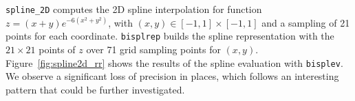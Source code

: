 \documentclass[11pt]{article}
\begin{document}
\texttt{spline\_2D} computes the 2D spline interpolation for function $z=(x+y)e^{-6(x^2+y^2)}$, with $(x,y) \in [-1,1]\times[-1,1]$ and a sampling of 21 points for each coordinate. \texttt{bisplrep} builds the spline representation with the $21 \times 21$ points of $z$ over 71 grid sampling points for $(x,y)$. Figure~\ref{fig:spline2d_rr} shows the results of the spline evaluation with \texttt{bisplev}.  We observe a significant loss of precision in places, which follows 
an interesting pattern that could be further investigated. 


\end{document}
